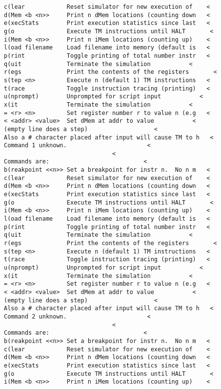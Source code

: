 \documentclass[12pt]{book}
\begin{document}
\begin{lstlisting}
c(lear            Reset simulator for new execution of    <
d(Mem <b <n>>     Print n dMem locations (counting down   <
e(xecStats        Print execution statistics since last   <
g(o               Execute TM instructions until HALT       <
i(Mem <b <n>>     Print n iMem locations (counting up)    <
l(oad filename    Load filename into memory (default is   <
p(rint            Toggle printing of total number instr   <
q(uit             Terminate the simulation           <
r(egs             Print the contents of the registers       <
s(tep <n>         Execute n (default 1) TM instructions   <
t(race            Toggle instruction tracing (printing)   <
u(nprompt)        Unprompted for script input           <
x(it              Terminate the simulation           <
= <r> <n>         Set register number r to value n (e.g   <
< <addr> <value>  Set dMem at addr to value           <
(empty line does a step)                   <
Also a # character placed after input will cause TM to h   <
Command 1 unknown.                       <
                               <
Commands are:                           <
b(reakpoint <<n>> Set a breakpoint for instr n.  No n m   <
c(lear            Reset simulator for new execution of    <
d(Mem <b <n>>     Print n dMem locations (counting down   <
e(xecStats        Print execution statistics since last   <
g(o               Execute TM instructions until HALT       <
i(Mem <b <n>>     Print n iMem locations (counting up)    <
l(oad filename    Load filename into memory (default is   <
p(rint            Toggle printing of total number instr   <
q(uit             Terminate the simulation           <
r(egs             Print the contents of the registers       <
s(tep <n>         Execute n (default 1) TM instructions   <
t(race            Toggle instruction tracing (printing)   <
u(nprompt)        Unprompted for script input           <
x(it              Terminate the simulation           <
= <r> <n>         Set register number r to value n (e.g   <
< <addr> <value>  Set dMem at addr to value           <
(empty line does a step)                   <
Also a # character placed after input will cause TM to h   <
Command 2 unknown.                       <
                               <
Commands are:                           <
b(reakpoint <<n>> Set a breakpoint for instr n.  No n m   <
c(lear            Reset simulator for new execution of    <
d(Mem <b <n>>     Print n dMem locations (counting down   <
e(xecStats        Print execution statistics since last   <
g(o               Execute TM instructions until HALT       <
i(Mem <b <n>>     Print n iMem locations (counting up)    <

\end{lstlisting}
\end{document}
